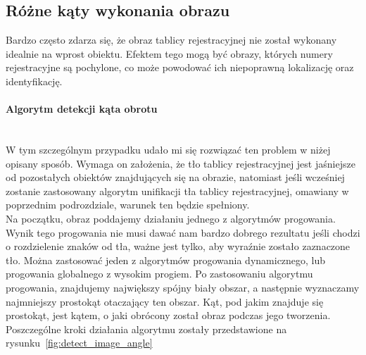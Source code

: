 \subsection{Różne kąty wykonania obrazu}
Bardzo często zdarza się, że obraz tablicy rejestracyjnej nie został wykonany idealnie na wprost obiektu. Efektem tego mogą być obrazy, których numery rejestracyjne są pochylone, co może powodować ich niepoprawną lokalizację oraz identyfikację.
\paragraph{Algorytm detekcji kąta obrotu}\mbox{}\\
W tym szczególnym przypadku udało mi się rozwiązać ten problem w niżej opisany sposób. Wymaga on założenia, że tło tablicy rejestracyjnej jest jaśniejsze od pozostałych obiektów znajdujących się na obrazie, natomiast jeśli wcześniej zostanie zastosowany algorytm unifikacji tła tablicy rejestracyjnej, omawiany w poprzednim podrozdziale, warunek ten będzie spełniony.\\
Na początku, obraz poddajemy działaniu jednego z algorytmów progowania. Wynik tego progowania nie musi dawać nam bardzo dobrego rezultatu jeśli chodzi o rozdzielenie znaków od tła, ważne jest tylko, aby wyraźnie zostało zaznaczone tło. Można zastosować jeden z algorytmów progowania dynamicznego, lub progowania globalnego z wysokim progiem. Po zastosowaniu algorytmu progowania, znajdujemy największy spójny biały obszar, a następnie wyznaczamy najmniejszy prostokąt otaczający ten obszar. Kąt, pod jakim znajduje się prostokąt, jest kątem, o jaki obrócony został obraz podczas jego tworzenia.\\
Poszczególne kroki działania algorytmu zostały przedstawione na rysunku~\ref{fig:detect_image_angle}

